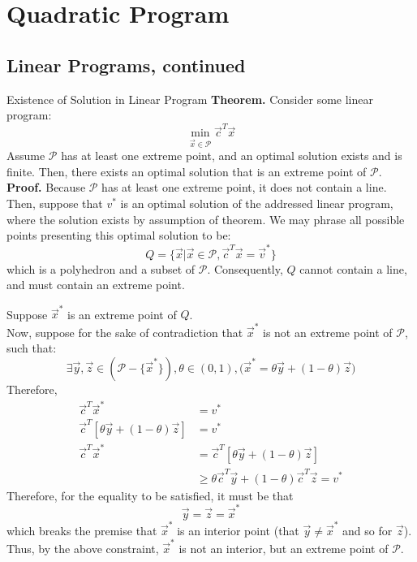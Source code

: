\chapter{Quadratic Program}

\section{Linear Programs, continued}
\begin{ln-theorem}{Existence of Solution in Linear Program}{}
    \textbf{Theorem.}
    Consider some linear program:
    \[
        \min_{\vec{x} \in \mathcal{P}} \vec{c}^T \vec{x}
    \]
    Assume $\mathcal{P}$ has at least one extreme point, and an optimal solution exists and is finite.
    Then, there exists an optimal solution that is an extreme point of $\mathcal{P}$.
    \tcblower
    \textbf{Proof.}
    Because $\mathcal{P}$ has at least one extreme point, it does not contain a line. \\
    Then, suppose that $v^*$ is an optimal solution of the addressed linear program, where the solution exists by assumption of theorem.
    We may phrase all possible points presenting this optimal solution to be:
    \[
        Q = \{\vec{x} | \vec{x} \in \mathcal{P}, \vec{c}^T \vec{x} = \vec{v}^*\}
    \]
    which is a polyhedron and a subset of $\mathcal{P}$. Consequently, $Q$ cannot contain a line, and must contain an extreme point.
    
    Suppose $\vec{x}^*$ is an extreme point of $Q$. \\
    Now, suppose for the sake of contradiction that $\vec{x}^*$ is not an extreme point of $\mathcal{P}$, such that:
    \[
        \exists \vec{y}, \vec{z} \in (\mathcal{P} - \{\vec{x}^*\}), \theta \in (0, 1), \big( \vec{x}^* = \theta \vec{y} + (1 - \theta) \vec{z} \big)
    \]
    Therefore, 
    \begin{align*}
        \vec{c}^T \vec{x}^* &= v^* \\
        \vec{c}^T [\theta \vec{y} + (1 - \theta) \vec{z}] &= v^* \\
        \vec{c}^T \vec{x}^*
        &= \vec{c}^T [\theta \vec{y} + (1 - \theta) \vec{z}] \\
        &\geq \theta \vec{c}^T \vec{y} + (1 - \theta) \vec{c}^T \vec{z} = v^*
    \end{align*}
    Therefore, for the equality to be satisfied, it must be that
    \[
        \vec{y} = \vec{z} = \vec{x}^*
    \]
    which breaks the premise that $\vec{x}^*$ is an interior point (that $\vec{y} \neq \vec{x}^*$ and so for $\vec{z}$). \\
    Thus, by the above constraint, $\vec{x}^*$ is not an interior, but an extreme point of $\mathcal{P}$.
\end{ln-theorem}

